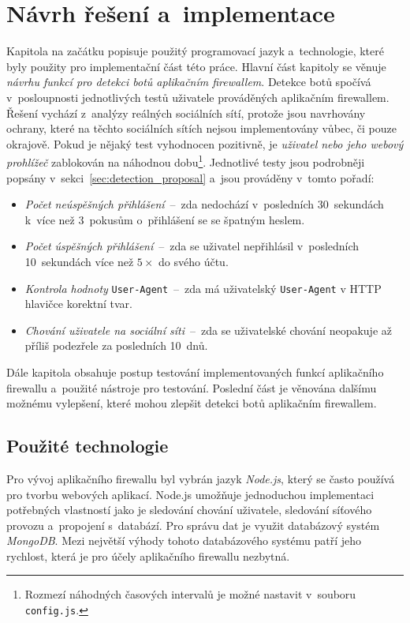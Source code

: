 \chapter{Návrh řešení a~implementace}
\label{chap:proposal_of_solution}
Kapitola na začátku popisuje použitý programovací jazyk a~technologie, které byly použity pro implementační část této práce. Hlavní část kapitoly se věnuje \textit{návrhu funkcí pro detekci botů aplikačním firewallem}. Detekce botů spočívá v~posloupnosti jednotlivých testů uživatele prováděných aplikačním firewallem. Řešení vychází z~analýzy reálných sociálních sítí, protože jsou navrhovány ochrany, které na těchto sociálních sítích nejsou implementovány vůbec, či pouze okrajově. Pokud je nějaký test vyhodnocen pozitivně, je \textit{uživatel nebo jeho webový prohlížeč} zablokován na náhodnou dobu\footnote{Rozmezí náhodných časových intervalů je možné nastavit v~souboru \texttt{config.js}.}. Jednotlivé testy jsou podrobněji popsány v~sekci~\ref{sec:detection_proposal} a~jsou prováděny v~tomto pořadí:

\begin{itemize}
  \item \textit{Počet neúspěšných přihlášení}~--~zda nedochází v~posledních 30~sekundách k~více než 3~pokusům o~přihlášení se se špatným heslem.
  \item \textit{Počet úspěšných přihlášení}~--~zda se uživatel nepřihlásil v~posledních 10~sekundách více než $5\times$ do svého účtu.
  \item \textit{Kontrola hodnoty} \texttt{User-Agent}~--~zda má uživatelský \texttt{User-Agent} v HTTP hlavičce korektní tvar.
  \item \textit{Chování uživatele na sociální síti}~--~zda se uživatelské chování neopakuje až příliš podezřele za posledních 10~dnů.
\end{itemize}

\noindent
Dále kapitola obsahuje postup testování implementovaných funkcí aplikačního firewallu a~použité nástroje pro testování. Poslední část je věnována dalšímu možnému vylepšení, které mohou zlepšit detekci botů aplikačním firewallem.

\section{Použité technologie}
Pro vývoj aplikačního firewallu byl vybrán jazyk \textit{Node.js}, který se často používá pro tvorbu webových aplikací. Node.js umožňuje jednoduchou implementaci potřebných vlastností jako je sledování chování uživatele, sledování síťového provozu a~propojení s~databází. Pro správu dat je využit databázový systém \textit{MongoDB}. Mezi největší výhody tohoto databázového systému patří jeho rychlost, která je pro účely aplikačního firewallu nezbytná.

